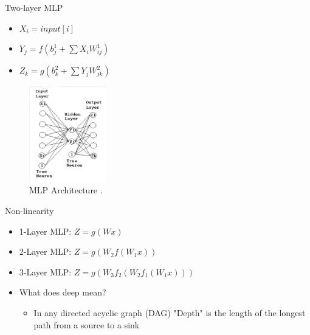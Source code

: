 \begin{frame}{Two-layer MLP}
    \begin{itemize}
        \item $X_i = input[i]$
        \item $Y_j = f(b^1_j + \sum{X_i W^1_{ij}})$
        \item $Z_k = g(b^2_k + \sum{Y_j W^2_{jk}})$
    \end{itemize}
	\begin{figure}[H]
		\centering
		\includegraphics[width=0.3\textwidth]{Figs/MLP2.png}
		\caption{MLP Architecture \cite{Gonna Replace It/}.}
	\end{figure}
\end{frame}

\begin{frame}{Non-linearity}
\begin{itemize}
    \item 1-Layer MLP: $Z = g(Wx)$
    \item 2-Layer MLP: $Z = g(W_2f(W_1x))$
    \item 3-Layer MLP: $Z = g(W_3f_2(W_2f_1(W_1x)))$
    \item What does deep mean?
    \begin{itemize}
        \item In any directed acyclic graph (DAG) "Depth" is the length of the longest path from a source to a sink
    \end{itemize}
\end{itemize}
    
\end{frame}

